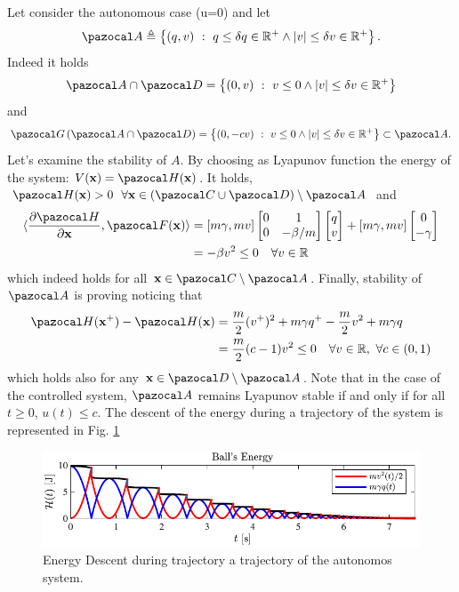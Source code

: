 \begin{exmp}
Let consider the autonomous case (u=0) and let 
%
\begin{equation}
    \A\triangleq \left\{(q,v)~:~q\leq\delta q\in\R^+\land |v|\leq\delta v\in\R^+\right\}.
\end{equation}
%
Indeed it holds 
%
\begin{equation}
    \A\cap\D = \left\{(0,v)~:~v\leq 0\land |v|\leq\delta v\in\R^+\right\}
\end{equation}
%
and
%
\begin{equation}
    \G\left(\A\cap\D\right) = \left\{(0,-cv)~:~v\leq 0\land |v|\leq\delta v\in\R^+\right\}\subset \A.
\end{equation}
%
Let's examine the stability of $A$. By choosing as Lyapunov function the energy of the system: $V(\xb) = \Ha(\xb)$. It holds, $\Ha(\xb)>0~~\forall \xb\in\left(\C\cup\D\right)\setminus\A$ and
%
\begin{align}
    \langle\frac{\partial\Ha}{\partial \xb},\F(\x)\rangle &= [m\gamma,mv]\begin{bmatrix}0&1\\0&-\beta/m\end{bmatrix}\begin{bmatrix}q\\v\end{bmatrix} + [m\gamma,mv] \begin{bmatrix}0\\-\gamma\end{bmatrix} \\
    & = -\beta v^2 \leq 0\quad\forall v\in\R
\end{align}
%
which indeed holds for all $\xb\in\C\setminus\A$.
%
Finally, stability of $\A$ is proving noticing that
%
\begin{align}
    \Ha(\x^+) -\Ha(\xb) &= \frac{m}{2}(v^+)^2 + m\gamma q^+ - \frac{m}{2}v^2 + m\gamma q\\
    &= \frac{m}{2}(c-1)v^2\leq 0 \quad\forall v\in\R,~\forall c\in(0,1)
\end{align}
%
which holds also for any $\xb\in\D\setminus\A$. Note that in the case of the controlled system, $\A$ remains Lyapunov stable if and only if for all $t\geq 0$, $u(t)\leq c$. The descent of the energy during a trajectory of the system is represented in Fig. \ref{fig:bb2}
%
\begin{figure}[!h]
    \centering
    \includegraphics{Figures/bb2.pdf}
    \caption{Energy Descent during trajectory a trajectory of the autonomos system.}
    \label{fig:bb2}
\end{figure}
%
\end{exmp}
%
%
\clearpage